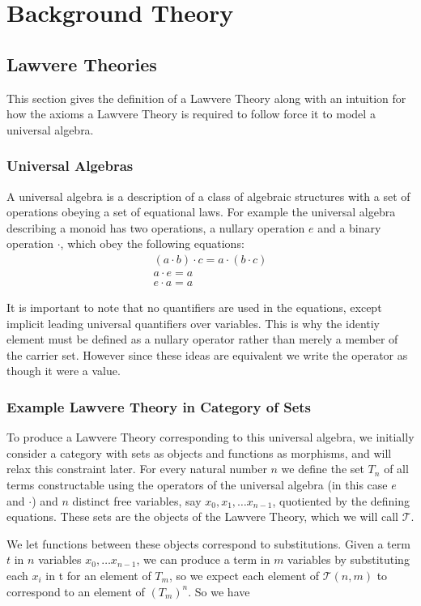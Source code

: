 \chapter{Background Theory}
\section{Lawvere Theories}
This section gives the definition of a Lawvere Theory along with an intuition
for how the axioms a Lawvere Theory is required to follow force it to model a
universal algebra. 

\subsection{Universal Algebras}
A universal algebra is a description of a class of algebraic structures with a
set of operations obeying a set of equational laws. For example the universal
algebra describing a monoid has two operations, a nullary operation $e$ and a
binary operation $\cdot$, which obey the following equations:
\begin{gather*}
    (a\cdot b)\cdot c = a\cdot (b\cdot c) \\
    a \cdot e = a \\
    e \cdot a = a
\end{gather*}

It is important to note that no quantifiers are used in the equations, except
implicit leading universal quantifiers over variables. This is why the identiy
element must be defined as a nullary operator rather than merely a member of the
carrier set. However since these ideas are equivalent we write the operator as
though it were a value.

\subsection{Example Lawvere Theory in Category of Sets}
To produce a Lawvere Theory corresponding to this universal algebra, we
initially consider a category with sets as objects and functions as morphisms,
and will relax this constraint later. For every natural number $n$ we define the
set $T_n$ of all terms constructable using the operators of the universal
algebra (in this case $e$ and $\cdot$) and $n$ distinct free variables, say
$x_0, x_1,\ldots x_{n-1}$, quotiented by the defining equations. These sets are
the objects of the Lawvere Theory, which we will call $\mathcal{T}$.

We let functions between these objects correspond to substitutions. Given a term
$t$ in $n$ variables $x_0,\ldots x_{n-1}$, we can produce a term in $m$
variables by substituting each $x_i$ in t for an element of $T_m$, so we expect
each element of $\mathcal{T}(n, m)$ to correspond to an element of $(T_m)^n$. So
we have

